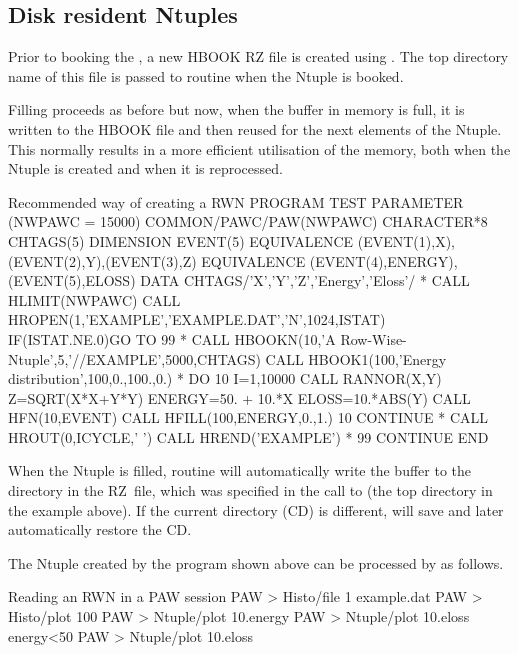 \subsection*{Disk resident Ntuples} 

Prior to booking the \RWN{}, a new HBOOK RZ file is created
using . 
The top directory name of this file is passed
to routine  when the Ntuple is booked.

Filling proceeds as before but now, when the buffer in memory
is full, it is written to the HBOOK file and then reused
for the next elements of the Ntuple. 
This normally results in a more efficient 
utilisation of the memory,
both when the Ntuple is created and when it is reprocessed.

\begin{XMPt}{Recommended way of creating a RWN}
      PROGRAM TEST
      PARAMETER (NWPAWC = 15000)
      COMMON/PAWC/PAW(NWPAWC)
      CHARACTER*8 CHTAGS(5)
      DIMENSION EVENT(5)
      EQUIVALENCE (EVENT(1),X),(EVENT(2),Y),(EVENT(3),Z)
      EQUIVALENCE (EVENT(4),ENERGY),(EVENT(5),ELOSS)
      DATA CHTAGS/'X','Y','Z','Energy','Eloss'/
*
      CALL HLIMIT(NWPAWC)
      CALL HROPEN(1,'EXAMPLE','EXAMPLE.DAT','N',1024,ISTAT)
      IF(ISTAT.NE.0)GO TO 99
*
      CALL HBOOKN(10,'A Row-Wise-Ntuple',5,'//EXAMPLE',5000,CHTAGS)
      CALL HBOOK1(100,'Energy distribution',100,0.,100.,0.)
*
      DO 10 I=1,10000
         CALL RANNOR(X,Y)
         Z=SQRT(X*X+Y*Y)
         ENERGY=50. + 10.*X
         ELOSS=10.*ABS(Y)
         CALL HFN(10,EVENT)
         CALL HFILL(100,ENERGY,0.,1.)
 10   CONTINUE
*
      CALL HROUT(0,ICYCLE,' ')
      CALL HREND('EXAMPLE')
*
 99   CONTINUE
      END
\end{XMPt}


When the Ntuple is filled, routine  will
automatically write the buffer to the directory in the
RZ~file, which was specified in the call to 
(the top directory  in the example above).
If the current directory (CD)
is different,  will save and
later automatically restore the CD.

The Ntuple created by the program shown above can be processed
by \PAW{} as follows.

\begin{XMPt}{Reading an RWN in a PAW session}
            PAW > Histo/file  1  example.dat
            PAW > Histo/plot 100
            PAW > Ntuple/plot 10.energy
            PAW > Ntuple/plot 10.eloss  energy<50
            PAW > Ntuple/plot 10.eloss%
\end{XMPt}


